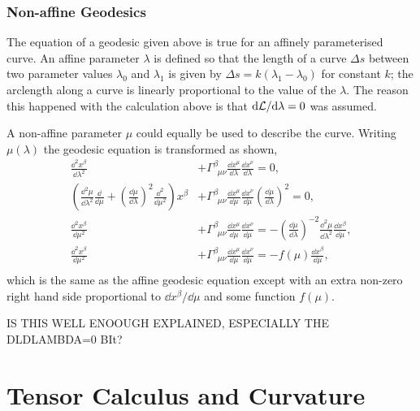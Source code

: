 \subsubsection*{Non-affine Geodesics}
The equation of a geodesic given above is true for an affinely parameterised curve. An affine parameter $\lambda$ is defined so that the length of a curve $\Delta s$ between two parameter values $\lambda_0$ and $\lambda_1$ is given by $\Delta s = k {(\lambda_1-\lambda_0)}$ for constant $k$; the arclength along a curve is linearly proportional to the value of the $\lambda$. The reason this happened with the calculation above is that $\dd \mathcal{L} / \dd \lambda=0$ was assumed.

A non-affine parameter $\mu$ could equally be used to describe the curve. Writing $\mu(\lambda)$ the geodesic equation is transformed as shown,
\begin{align}
\frac{\dd ^2 {x}^\beta}{\dd \lambda^2} &+ \Gamma^\beta_{\,\,\,\mu\nu}\frac{\dd {x}^\mu}{\dd \lambda}\frac{\dd {x}^\nu}{\dd \lambda}=0,\\
\left(  \frac{\dd^2 \mu}{\dd \lambda^2} \frac{\dd}{\dd\mu}  + \left( \frac{\dd \mu}{\dd \lambda} \right)^2 \frac{\dd^2}{\dd \mu^2} \right) {x}^\beta     &+ \Gamma^\beta_{\,\,\,\mu\nu}\frac{\dd {x}^\mu}{\dd \mu}\frac{\dd {x}^\nu}{\dd \mu}\left( \frac{\dd \mu}{\dd \lambda} \right)^2=0,\\
    \frac{\dd^2 {x}^\beta }{\dd \mu^2}     &+ \Gamma^\beta_{\,\,\,\mu\nu}\frac{\dd {x}^\mu}{\dd \mu}\frac{\dd {x}^\nu}{\dd \mu}=- \left( \frac{\dd \mu}{\dd \lambda} \right)^{-2}\frac{\dd^2\mu}{\dd \lambda^2} \frac{\dd x^\beta}{\dd\mu},\\
    \frac{\dd^2 {x}^\beta }{\dd \mu^2}     &+ \Gamma^\beta_{\,\,\,\mu\nu}\frac{\dd {x}^\mu}{\dd \mu}\frac{\dd {x}^\nu}{\dd \mu}=- f(\mu) \frac{\dd x^\beta}{\dd\mu},\\
\end{align}
which is the same as the affine geodesic equation except with an extra non-zero right hand side proportional to $\dd x^\beta/\dd \mu$ and some function $f(\mu)$. 


IS THIS WELL ENOOUGH EXPLAINED, ESPECIALLY THE DLDLAMBDA=0 BIt?







\section{Tensor Calculus and Curvature}



